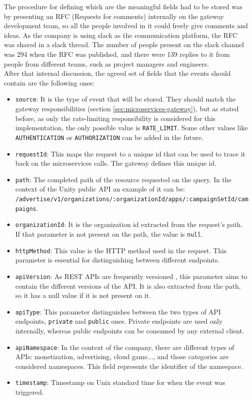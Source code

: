 \documentclass[english, 12pt, a4paper, sci, utf8, a-1b, online]{aaltothesis}
\begin{document}
The procedure for defining which are the meaningful fields had to be stored was by presenting an RFC (Requests for comments) \cite{reynolds1987request} internally on the gateway development team, so all the people involved in it could freely give comments and ideas. As the company is using slack as the communication platform, the RFC was shared in a slack thread. The number of people present on the slack channel was 294 when the RFC was published, and there were 139 replies to it from people from different teams, such as project managers and engineers.\\

After that internal discussion, the agreed set of fields that the events should contain are the following ones:

\begin{itemize}
    \item \texttt{source}: It is the type of event that will be stored. They should match the gateway responsibilities (section \ref{sec:microservices-gateway}), but as stated before, as only the rate-limiting responsibility is considered for this implementation, the only possible value is \texttt{RATE\_LIMIT}. Some other values like \texttt{AUTHENTICATION} or \texttt{AUTHORIZATION} can be added in the future.
    \item \texttt{requestId}: This maps the request to a unique id that can be used to trace it back on the microservices calls. The gateway defines this unique id.
    \item \texttt{path}: The completed path of the resource requested on the query. In the context of the Unity public API an example of it can be: \\ \texttt{/advertise/v1/organizations/:organizationId/apps/:campaignSetId/campaigns}.
    \item \texttt{organizationId}: It is the organization id extracted from the request's path. If that parameter is not present on the path, the value is \texttt{null}.
    \item \texttt{httpMethod}: This value is the HTTP method used in the request. This parameter is essential for distinguishing between different endpoints.
    \item \texttt{apiVersion}: As REST APIs are frequently versioned \cite{varga2016versioning}, this parameter aims to contain the different versions of the API. It is also extracted from the path, so it has a null value if it is not present on it.
    \item \texttt{apiType}: This parameter distinguishes between the two types of API endpoints, \texttt{private} and \texttt{public} ones. Private endpoints are used only internally, whereas public endpoints can be consumed by any external client.
    \item \texttt{apiNamespace}: In the context of the company, there are different types of APIs: monetization, advertising, cloud game..., and those categories are considered namespaces. This field represents the identifier of the namespace.
    \item \texttt{timestamp}: Timestamp on Unix standard time for when the event was triggered.
\end{itemize}
\end{document}
